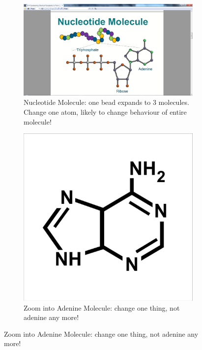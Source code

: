 \documentclass[]{article}
\begin{document}
\begin{figure}[H]
	\caption{{Nucleotide Molecule}\label{fig:{NucleotideMolecule} }}
	
	\begin{subfigure}[b]{0.45\textwidth}
		\centering
		\caption{Nucleotide Molecule: one bead expands to 3 molecules. Change one atom, likely to change behaviour of entire molecule!}
		\includegraphics[width=\textwidth]{NucleotideMolecule}
	\end{subfigure}
	\begin{subfigure}[b]{0.45\textwidth}
		\centering
		\caption{Zoom into Adenine Molecule: change one thing, not adenine any more!}
		\includegraphics[width=\textwidth]{AdenineMolecule}
	\end{subfigure}
\end{figure}
\end{document}
